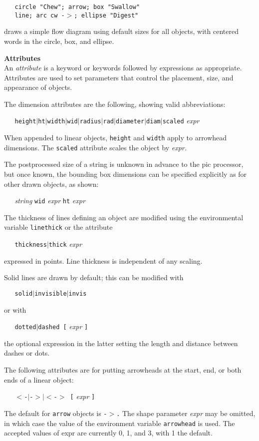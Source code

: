 {\tt \ \ \ circle {\tt "}Chew{\tt "}; arrow; box {\tt "}Swallow{\tt "}}
\\\hbox{}\hskip-1pt
{\tt \ \ \ line;\ arc\ cw\ -$>$;\ ellipse\ {\tt "}Digest{\tt "}}

draws a simple flow diagram using default sizes for all objects,
with centered words in the circle, box, and ellipse. 
%
\par\hskip-2pc{\bf Attributes}\\
An
{\it attribute}
is a keyword or keywords followed by expressions as appropriate.
Attributes are used to set parameters that control the placement,
size, and appearance of objects.

The dimension attributes are
the following, showing valid abbreviations:

{\tt \ \ \ height$|$ht$|$width$|$wid$|$radius$|$rad$|$diameter$|$diam$|$scaled}
{\it expr}

When appended to linear objects,
{\tt height}
and
{\tt width}
apply to arrowhead dimensions.
The
{\tt scaled}
attribute scales the object by
{\it expr.}

The postprocessed size of a string is unknown in advance to the
pic
processor, but once known, the bounding box dimensions can be specified
explicitly as for other drawn objects, as shown:

{\it \ \ \ string}
{\tt wid}
{\it expr}
{\tt ht}
{\it expr}

The thickness of lines defining an object are modified using
the environmental variable
{\tt linethick}
or the attribute

{\tt \ \ \ thickness$|$thick}
{\it expr}

expressed in points.
Line thickness is independent of any scaling.

Solid lines are drawn by default; this can be modified with

{\tt \ \ \ solid$|$invisible$|$invis}

or with

{\tt \ \ \ dotted$|$dashed\ [}
{\it expr}
{\tt ]}

the optional expression in the latter setting the length and distance
between dashes or dots.

The following attributes are for putting arrowheads at the start, end,
or both ends of a linear object:

{\tt \ \ \ $<$-$|$-$>$$|$$<$-$>$\ [}
{\it expr}
{\tt ]}

The default for
{\tt arrow}
objects is
{\tt -$>$.}
The shape parameter
{\it expr}
may be omitted, in which case the value of the environment variable
{\tt arrowhead}
is used.
The accepted values of expr are currently 0, 1, and 3, with 1 the default.

